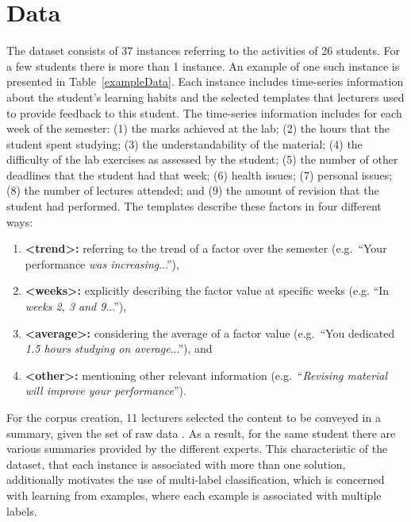 \documentclass[11pt]{article}
\begin{document}
\section{Data}

The dataset consists of 37 instances referring to the activities of 26
students. For a few students there is more than 1 instance. An example of one such instance is presented 
in Table~\ref{exampleData}. Each instance includes time-series information about the student's learning habits and
the selected templates that lecturers used to provide feedback to this student. The 
time-series information includes for each week of the semester: (1) the marks achieved at the lab; 
(2) the hours that the student spent studying; (3) the understandability 
of the material; (4) the difficulty of the lab exercises as assessed by the student; 
(5) the number of other deadlines that the student had that week;
(6) health issues; (7) personal issues; (8) the number of lectures attended; and 
(9) the amount of revision that the student had performed. The templates describe these factors 
in four different ways:
\begin{enumerate}
\item \textbf{\textless trend\textgreater{}:} referring to the trend of a factor over the semester 
(e.g.\ ``Your performance \textit{was increasing}...''), 
\item \textbf{\textless weeks\textgreater{}:} explicitly 
describing the factor value at specific weeks (e.g. ``In \textit{weeks 2, 3 and 9}...''), 
\item \textbf{\textless average\textgreater{}:} 
considering the average of a factor
value (e.g.\ ``You dedicated \textit{1.5 hours studying on average}...''), and 
\item \textbf{\textless other\textgreater{}:} mentioning 
other relevant information (e.g.\ ``\textit{Revising material will improve your performance}''). 
\end {enumerate}


For the corpus creation, 11 lecturers selected the content to be
conveyed in a summary, given the set of raw data \cite{Gkatzia2013}. 
As a result, for the same student there are various summaries provided
by the different experts. This characteristic of the dataset, that each instance is associated with more than one solution, additionally motivates 
the use of multi-label classification, which is concerned with 
learning from examples, where each example is associated with multiple labels. 
\end{document}
